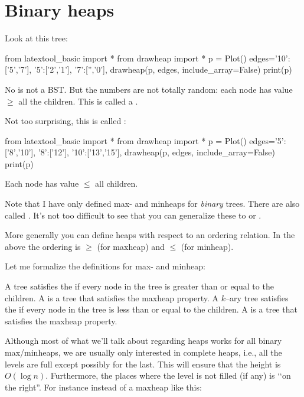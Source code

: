 \section{Binary heaps}

Look at this tree:

\begin{python}
from latextool_basic import *
from drawheap import *
p = Plot()
edges={'10':['5','7'],
       '5':['2','1'],
       '7':['','0'],
       }
drawheap(p, edges, include_array=False)
print(p)
\end{python}



No is not a BST.
But the numbers are not totally random:
each node has value $\geq$ all
the children.
This is called a .

Not too surprising, this is called :

\begin{python}
from latextool_basic import *
from drawheap import *
p = Plot()
edges={'5':['8','10'],
       '8':['12'],
       '10':['13','15'],
       }
drawheap(p, edges, include_array=False)
print(p)
\end{python}

Each node has value $\leq$ all children.

Note that I have only defined max- and minheaps for \textit{binary} 
trees.
There are also called .
It's not too difficult to see that you can
generalize these to
or
.

More generally you can define heaps with respect to an ordering relation.
In the above the ordering is $\geq$ (for maxheap)
and $\leq$ (for minheap).

Let me formalize the definitions for max- and minheap:

A tree satisfies the 
if every node in the tree is greater than or equal to the children.
A  is a tree that satisfies the maxheap property.
A $k$--ary tree satisfies the 
if every node in the tree is less than or equal  to the children.
A  is a tree that satisfies the maxheap property.

Although most of what we'll talk about regarding heaps works
for all binary max/minheaps, we are usually only interested in
complete heaps, i.e., all the levels are full except possibly for the last.
This will ensure that the height is $O(\log n)$.
Furthermore, the places where the level is not filled (if any)
is \lq\lq on the
right''.
For instance instead of a maxheap like this:


